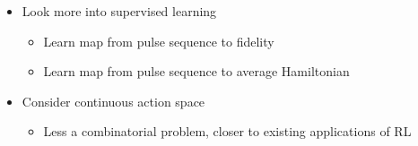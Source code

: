 \documentclass[twocolumn, aps, 10pt]{revtex4-2}
\begin{document}

\begin{itemize}

\item Look more into supervised learning

  \begin{itemize}
  
  \item Learn map from pulse sequence to fidelity
  \item Learn map from pulse sequence to average Hamiltonian
  \end{itemize}
\item Consider continuous action space

  \begin{itemize}
  
  \item Less a combinatorial problem, closer to existing applications of RL
  \end{itemize}
\end{itemize}


\end{document}
